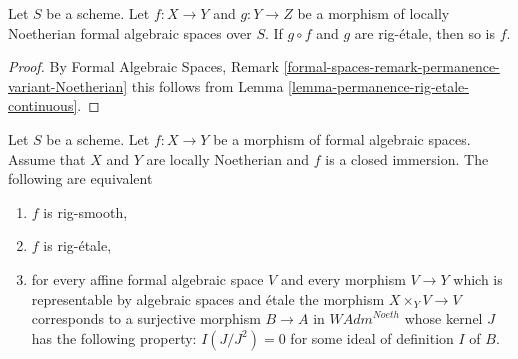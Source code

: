 \begin{lemma}
\label{lemma-rig-etale-permanence}
Let $S$ be a scheme. Let $f : X \to Y$ and $g : Y \to Z$
be a morphism of locally Noetherian formal algebraic spaces over $S$.
If $g \circ f$ and $g$ are rig-\'etale, then so is $f$.
\end{lemma}

\begin{proof}
By Formal Algebraic Spaces, Remark
\ref{formal-spaces-remark-permanence-variant-Noetherian}
this follows from Lemma \ref{lemma-permanence-rig-etale-continuous}.
\end{proof}

\begin{lemma}
\label{lemma-closed-immersion-rig-smooth}
Let $S$ be a scheme. Let $f : X \to Y$ be a morphism of formal algebraic
spaces. Assume that $X$ and $Y$ are locally Noetherian and $f$ is a
closed immersion. The following are equivalent
\begin{enumerate}
\item $f$ is rig-smooth,
\item $f$ is rig-\'etale,
\item for every affine formal algebraic space $V$ and every morphism
$V \to Y$ which is representable by algebraic spaces and \'etale
the morphism $X \times_Y V \to V$ corresponds to a surjective morphism
$B \to A$ in $\textit{WAdm}^{Noeth}$ whose kernel $J$ has the following
property: $I(J/J^2) = 0$ for some ideal of definition $I$ of $B$.
\end{enumerate}
\end{lemma}

